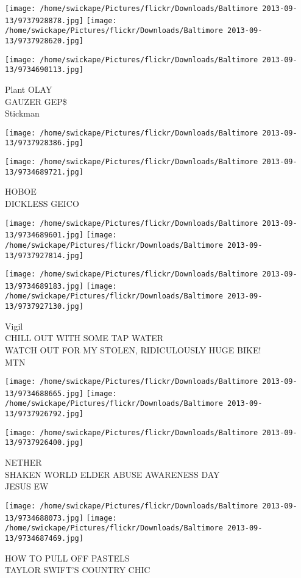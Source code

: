 \documentclass[10pt,letterpaper]{article}
\begin{document}
\texttt{[image: /home/swickape/Pictures/flickr/Downloads/Baltimore 2013-09-13/9737928878.jpg]}
\texttt{[image: /home/swickape/Pictures/flickr/Downloads/Baltimore 2013-09-13/9737928620.jpg]}

\texttt{[image: /home/swickape/Pictures/flickr/Downloads/Baltimore 2013-09-13/9734690113.jpg]}

Plant OLAY\\
GAUZER GEP\$\\
Stickman
\pagebreak

\texttt{[image: /home/swickape/Pictures/flickr/Downloads/Baltimore 2013-09-13/9737928386.jpg]}

\vspace{0.25in}
\texttt{[image: /home/swickape/Pictures/flickr/Downloads/Baltimore 2013-09-13/9734689721.jpg]}

HOBOE\\
DICKLESS GEICO
\pagebreak

\texttt{[image: /home/swickape/Pictures/flickr/Downloads/Baltimore 2013-09-13/9734689601.jpg]}
\texttt{[image: /home/swickape/Pictures/flickr/Downloads/Baltimore 2013-09-13/9737927814.jpg]}

\texttt{[image: /home/swickape/Pictures/flickr/Downloads/Baltimore 2013-09-13/9734689183.jpg]}
\texttt{[image: /home/swickape/Pictures/flickr/Downloads/Baltimore 2013-09-13/9737927130.jpg]}

Vigil\\
CHILL OUT WITH SOME TAP WATER\\
WATCH OUT FOR MY STOLEN, RIDICULOUSLY HUGE BIKE!\\
MTN
\pagebreak

\texttt{[image: /home/swickape/Pictures/flickr/Downloads/Baltimore 2013-09-13/9734688665.jpg]}
\texttt{[image: /home/swickape/Pictures/flickr/Downloads/Baltimore 2013-09-13/9737926792.jpg]}

\vspace{0.25in}
\texttt{[image: /home/swickape/Pictures/flickr/Downloads/Baltimore 2013-09-13/9737926400.jpg]}

NETHER\\
SHAKEN WORLD ELDER ABUSE AWARENESS DAY\\
JESUS EW
\pagebreak

\texttt{[image: /home/swickape/Pictures/flickr/Downloads/Baltimore 2013-09-13/9734688073.jpg]}
\texttt{[image: /home/swickape/Pictures/flickr/Downloads/Baltimore 2013-09-13/9734687469.jpg]}

HOW TO PULL OFF PASTELS\\
TAYLOR SWIFT'S COUNTRY CHIC
\pagebreak
\end{document}
